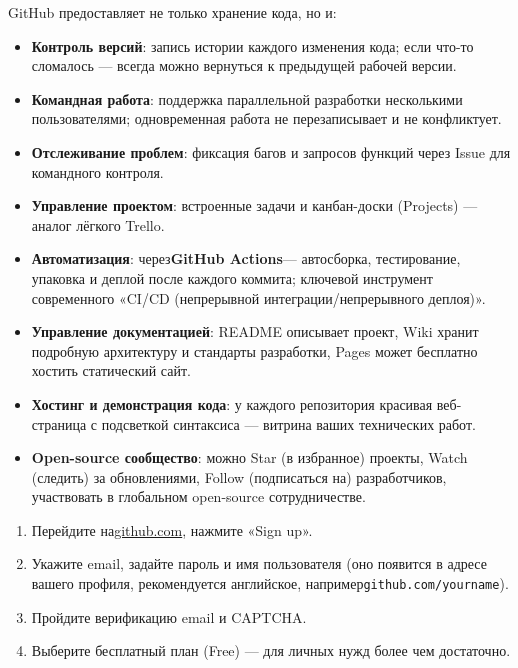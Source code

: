 
GitHub предоставляет не только хранение кода, но и:

\begin{itemize}
  \item \textbf{Контроль версий}: запись истории каждого изменения кода; если что-то сломалось — всегда можно вернуться к предыдущей рабочей версии.
  \item \textbf{Командная работа}: поддержка параллельной разработки несколькими пользователями; одновременная работа не перезаписывает и не конфликтует.
  \item \textbf{Отслеживание проблем}: фиксация багов и запросов функций через Issue для командного контроля.
  \item \textbf{Управление проектом}: встроенные задачи и канбан-доски (Projects) — аналог лёгкого Trello.
  \item \textbf{Автоматизация}: через\textbf{GitHub Actions}— автосборка, тестирование, упаковка и деплой после каждого коммита; ключевой инструмент современного «CI/CD (непрерывной интеграции/непрерывного деплоя)».
  \item \textbf{Управление документацией}: README описывает проект, Wiki хранит подробную архитектуру и стандарты разработки, Pages может бесплатно хостить статический сайт.
  \item \textbf{Хостинг и демонстрация кода}: у каждого репозитория красивая веб-страница с подсветкой синтаксиса — витрина ваших технических работ.
  \item \textbf{Open-source сообщество}: можно Star (в избранное) проекты, Watch (следить) за обновлениями, Follow (подписаться на) разработчиков, участвовать в глобальном open-source сотрудничестве.
\end{itemize}



\begin{enumerate}
  \item Перейдите на\href{https://github.com}{github.com}, нажмите «Sign up».
  \item Укажите email, задайте пароль и имя пользователя (оно появится в адресе вашего профиля, рекомендуется английское, например\texttt{github.\allowbreak com/\allowbreak yourname}).
  \item Пройдите верификацию email и CAPTCHA.
  \item Выберите бесплатный план (Free) — для личных нужд более чем достаточно.
\end{enumerate}

